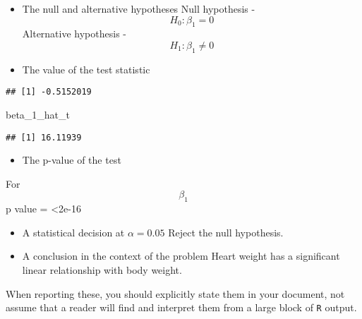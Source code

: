\documentclass[
]{article}
\newenvironment{Shaded}{\begin{snugshade}}{\end{snugshade}}
\newcommand{\FunctionTok}[1]{\textcolor[rgb]{0.00,0.00,0.00}{#1}}
\newcommand{\NormalTok}[1]{#1}
\newcommand{\OtherTok}[1]{\textcolor[rgb]{0.56,0.35,0.01}{#1}}
\newcommand{\SpecialCharTok}[1]{\textcolor[rgb]{0.00,0.00,0.00}{#1}}
\newcommand{\StringTok}[1]{\textcolor[rgb]{0.31,0.60,0.02}{#1}}
\providecommand{\tightlist}{%
  \setlength{\itemsep}{0pt}\setlength{\parskip}{0pt}}
\begin{document}
\begin{itemize}
\item
  The null and alternative hypotheses Null hypothesis -
  \[H_0: \beta_1 = 0\] Alternative hypothesis - \[H_1: \beta_1 \neq 0\]
\item
  The value of the test statistic
\end{itemize}

\begin{Shaded}
\end{Shaded}

\begin{verbatim}
## [1] -0.5152019
\end{verbatim}

\begin{Shaded}
\begin{Highlighting}[]
\NormalTok{beta\_1\_hat\_t}
\end{Highlighting}
\end{Shaded}

\begin{verbatim}
## [1] 16.11939
\end{verbatim}

\begin{itemize}
\tightlist
\item
  The p-value of the test
\end{itemize}

For \[\beta_1\] p value = \textless2e-16

\begin{itemize}
\item
  A statistical decision at \(\alpha = 0.05\) Reject the null
  hypothesis.
\item
  A conclusion in the context of the problem Heart weight has a
  significant linear relationship with body weight.
\end{itemize}

When reporting these, you should explicitly state them in your document,
not assume that a reader will find and interpret them from a large block
of \texttt{R} output.
\end{document}
